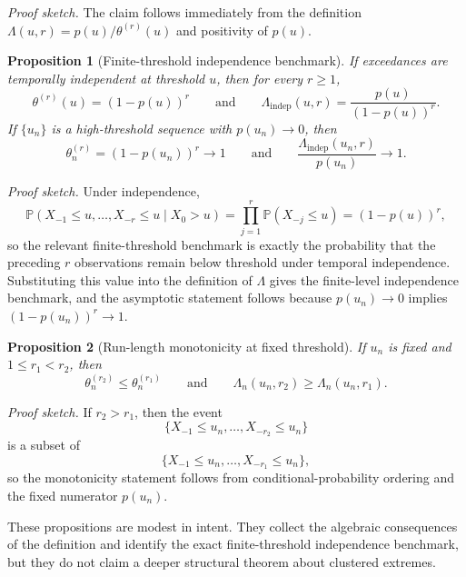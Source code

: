 \documentclass[11pt]{article}
\newtheorem{proposition}{Proposition}
\begin{document}
\textit{Proof sketch.}
The claim follows immediately from the definition $\Lambda(u,r)=p(u)/\theta^{(r)}(u)$ and positivity of $p(u)$.

\begin{proposition}[Finite-threshold independence benchmark]
If exceedances are temporally independent at threshold $u$, then for every $r\ge 1$,
\[
\theta^{(r)}(u)=(1-p(u))^r
\qquad\text{and}\qquad
\Lambda_{\mathrm{indep}}(u,r)=\frac{p(u)}{(1-p(u))^r}.
\]
If $\{u_n\}$ is a high-threshold sequence with $p(u_n)\to 0$, then
\[
\theta_n^{(r)}=(1-p(u_n))^r\to 1
\qquad\text{and}\qquad
\frac{\Lambda_{\mathrm{indep}}(u_n,r)}{p(u_n)}\to 1.
\]
\end{proposition}

\textit{Proof sketch.}
Under independence,
\[
\mathbb{P}\!\left(X_{-1}\le u,\dots,X_{-r}\le u \mid X_0>u\right)
=\prod_{j=1}^{r}\mathbb{P}(X_{-j}\le u)
=(1-p(u))^r,
\]
so the relevant finite-threshold benchmark is exactly the probability that the preceding $r$ observations remain below threshold under temporal independence. Substituting this value into the definition of $\Lambda$ gives the finite-level independence benchmark, and the asymptotic statement follows because $p(u_n)\to 0$ implies $(1-p(u_n))^r\to 1$.

\begin{proposition}[Run-length monotonicity at fixed threshold]
If $u_n$ is fixed and $1 \le r_1 < r_2$, then
\[
\theta_n^{(r_2)} \le \theta_n^{(r_1)}
\qquad\text{and}\qquad
\Lambda_n(u_n,r_2) \ge \Lambda_n(u_n,r_1).
\]
\end{proposition}

\textit{Proof sketch.}
If $r_2>r_1$, then the event
\[
\{X_{-1}\le u_n,\dots,X_{-r_2}\le u_n\}
\]
is a subset of
\[
\{X_{-1}\le u_n,\dots,X_{-r_1}\le u_n\},
\]
so the monotonicity statement follows from conditional-probability ordering and the fixed numerator $p(u_n)$.

These propositions are modest in intent. They collect the algebraic consequences of the definition and identify the exact finite-threshold independence benchmark, but they do not claim a deeper structural theorem about clustered extremes.
\end{document}
